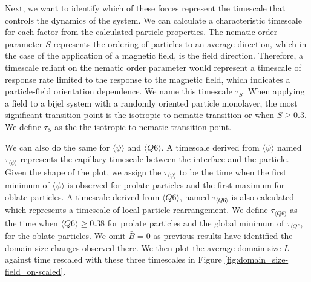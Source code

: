 Next, we want to identify which of these forces represent the timescale that controls the dynamics of the system. We can calculate a characteristic
timescale for each factor from the calculated particle properties.
The nematic order parameter $S$ represents the ordering of
particles to an average direction, which in the case of the application
of a magnetic field, is the field direction. Therefore, a timescale
reliant on the nematic order parameter would represent a timescale of
response rate limited to the response to the magnetic field, which
indicates a particle-field orientation dependence. We name this
timescale $\tau_S$. When applying a field to a bijel system with a
randomly oriented particle monolayer, the most significant transition
point is the isotropic to nematic transition or when $S \geq 0.3$. We
define $\tau_S$ as the the isotropic to nematic transition point.

We can also do the same for $\langle \psi \rangle$ and
$\langle Q6 \rangle$. A timescale derived from
$\langle \psi \rangle$ named $\tau_{\langle \psi \rangle}$
represents the capillary timescale between the interface and the
particle. Given the shape of the plot, we assign the
$\tau_{\langle \psi \rangle}$ to be the time when the first minimum of
$\langle \psi \rangle$ is observed for prolate particles and the first
maximum for oblate particles. A timescale derived from
$\langle Q6 \rangle$, named $\tau_{\langle Q6 \rangle}$ is also
calculated which represents a timescale of local particle rearrangement.
We define $\tau_{\langle Q6 \rangle}$ as the time when
\(\langle Q6 \rangle \geq 0.38\) for prolate particles and the global
minimum of $\tau_{\langle Q6 \rangle}$ for the oblate particles. We
omit \(\bar{B} = 0\) as previous results have identified the domain size
changes observed there. We then plot the average domain size \(L\)
against time rescaled with these three timescales in Figure
\ref{fig:domain_size-field_on-scaled}.

